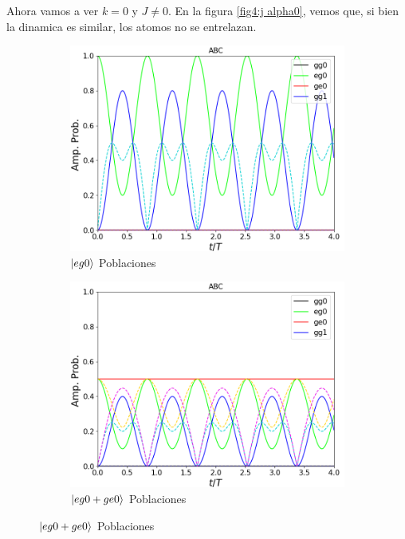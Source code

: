 Ahora vamos a ver $k=0$ y $J\neq 0$. En la figura \ref{fig4:j alpha0}, vemos que, si bien la dinamica es similar, los atomos no se entrelazan.

\begin{figure}[H]
    \centering
    \begin{subfigure}{0.49\textwidth}
        \includegraphics[width=\textwidth]{figuras/ch4/j eg0 abc.png}
        \caption{$\ket{eg0}$ Poblaciones}
        \label{fig4:pob j eg0}
    \end{subfigure}
    \hfill
    \begin{subfigure}{0.49\textwidth}
        \includegraphics[width=\textwidth]{figuras/ch4/j eg0+ge0 abc.png}
        \caption{$\ket{eg0+ge0}$ Poblaciones}

\end{subfigure}
\end{figure}
